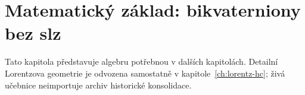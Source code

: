 
\chapter{Matematický základ: bikvaterniony bez slz}
Tato kapitola představuje algebru potřebnou v dalších kapitolách.  Detailní Lorentzova geometrie je odvozena samostatně v kapitole~\ref{ch:lorentz-hc}; živá učebnice neimportuje archiv historické konsolidace.
